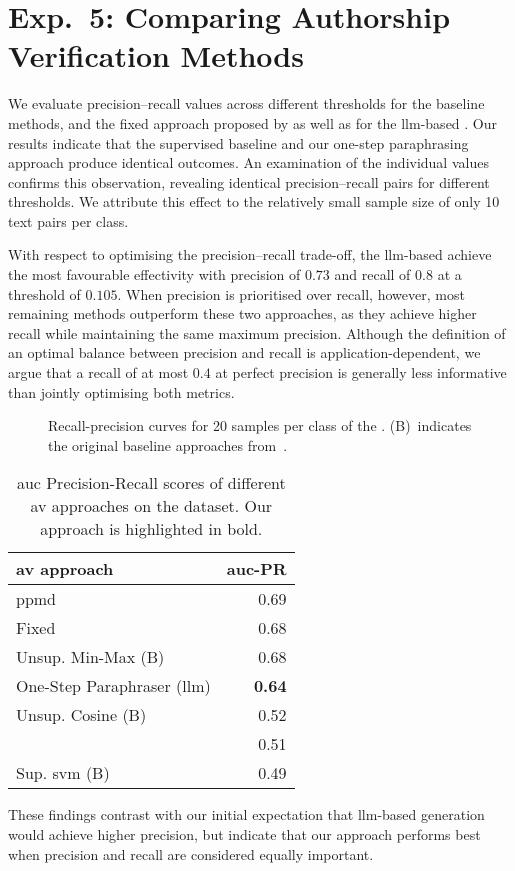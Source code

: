 \section{Exp.\ 5: Comparing Authorship Verification Methods}%
\label{sec:imp_gen_res}

We evaluate precision–recall values across different thresholds for the baseline methods, and the fixed approach proposed by \citet{koppel_determining_2014} as well as for the \ac{llm}-based \impAppr{}.
Our results indicate that the supervised baseline and our one-step paraphrasing approach produce identical outcomes.
An examination of the individual values confirms this observation, revealing identical precision–recall pairs for different thresholds.
We attribute this effect to the relatively small sample size of only 10 text pairs per class.

With respect to optimising the precision–recall trade-off, the \ac{llm}-based \impAppr{} achieve the most favourable effectivity with precision of $0.73$ and recall of $0.8$ at a threshold of $0.105$.
When precision is prioritised over recall, however, most remaining methods outperform these two approaches, as they achieve higher recall while maintaining the same maximum precision.
Although the definition of an optimal balance between precision and recall is application-dependent, we argue that a recall of at most $0.4$ at perfect precision is generally less informative than jointly optimising both metrics.

\begin{figure}[htbp]
    \centering
    
    \caption[Recall-precision curves for the \dataStudent{}]{Recall-precision curves for 20 samples per class of the \dataStudent{}. 
    (B)~indicates the original baseline approaches from~\citep{koppel_determining_2014}.
    }
    \label{fig:comp_naive_student}
\end{figure}

\begin{table}[h]
\centering
\label{tab:auc_pr}
\caption[\ac{auc} Precision-Recall results]{\ac{auc} Precision-Recall scores of different \ac{av} approaches on the \dataStudent{} dataset. 
Our approach is highlighted in bold.
}
\begin{tabular}{lr}
\toprule
\ac{av} approach           & \ac{auc}-PR \\
\midrule
\acs{ppmd}                       & 0.69   \\
Fixed                      & 0.68   \\
Unsup. Min-Max (B)         & 0.68   \\
One-Step Paraphraser (\ac{llm}) & \textbf{0.64}   \\
Unsup. Cosine (B)          & 0.52   \\
\unmasking{}                  & 0.51   \\
Sup. \ac{svm} (B)               & 0.49  \\
\bottomrule
\end{tabular}%
\end{table}

These findings contrast with our initial expectation that \ac{llm}-based \imp{} generation would achieve higher precision, but indicate that our approach performs best when precision and recall are considered equally important.
